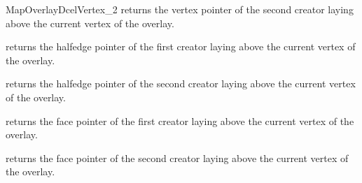 \begin{ccRefConcept}{MapOverlayDcelVertex_2}
  {returns the vertex pointer of the second creator laying above the current vertex of the overlay.}
  
  {returns the halfedge pointer of the first creator laying above the current vertex of the overlay.}

  {returns the halfedge pointer of the second creator laying above the current vertex of the overlay.}

  {returns the face pointer of the first creator laying above the current vertex of the overlay.}

  {returns the face pointer of the second creator laying above the current vertex of the overlay.}
  
\end{ccRefConcept} %

\ccRefPageEnd

